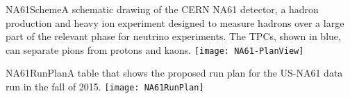 \begin{cdrfigure}{NA61Scheme}{A schematic drawing of the CERN NA61 detector, a hadron production and heavy ion experiment designed to measure hadrons over a large part of the relevant phase for neutrino experiments. The TPCs, shown in blue, can separate pions from protons and kaons.}
\texttt{[image: NA61-PlanView]}
\end{cdrfigure}

\begin{cdrfigure}{NA61RunPlan}{A table that shows the proposed run plan for 
the US-NA61 data run in the fall of 2015.}
\texttt{[image: NA61RunPlan]}
\end{cdrfigure}

